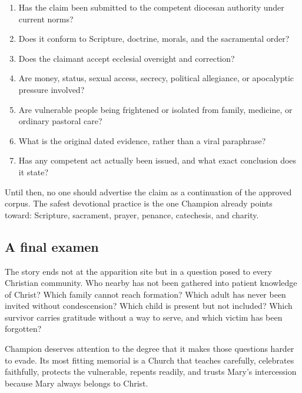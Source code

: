 \begin{enumerate}
  \item Has the claim been submitted to the competent diocesan authority under current norms?
  \item Does it conform to Scripture, doctrine, morals, and the sacramental order?
  \item Does the claimant accept ecclesial oversight and correction?
  \item Are money, status, sexual access, secrecy, political allegiance, or apocalyptic pressure involved?
  \item Are vulnerable people being frightened or isolated from family, medicine, or ordinary pastoral care?
  \item What is the original dated evidence, rather than a viral paraphrase?
  \item Has any competent act actually been issued, and what exact conclusion does it state?
\end{enumerate}

Until then, no one should advertise the claim as a continuation of the approved corpus. The safest devotional practice is the one Champion already points toward: Scripture, sacrament, prayer, penance, catechesis, and charity.

\subsection{A final examen}

The story ends not at the apparition site but in a question posed to every Christian community. Who nearby has not been gathered into patient knowledge of Christ? Which family cannot reach formation? Which adult has never been invited without condescension? Which child is present but not included? Which survivor carries gratitude without a way to serve, and which victim has been forgotten?

Champion deserves attention to the degree that it makes those questions harder to evade. Its most fitting memorial is a Church that teaches carefully, celebrates faithfully, protects the vulnerable, repents readily, and trusts Mary's intercession because Mary always belongs to Christ.
